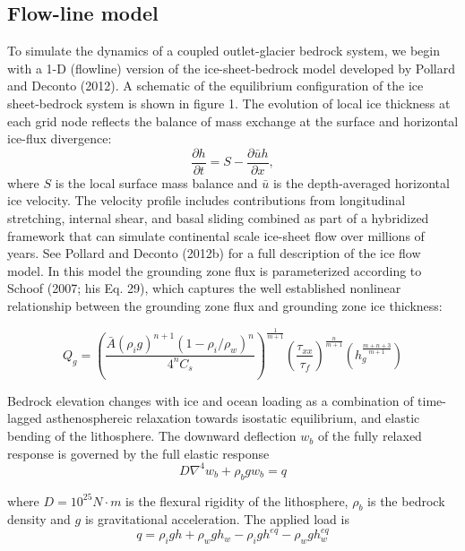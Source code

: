 \documentclass[tc, manuscript]{copernicus}
\begin{document}
\subsection{Flow-line model}
To simulate the dynamics of a coupled outlet-glacier bedrock system, we begin with a 1-D (flowline) version of the ice-sheet-bedrock model developed by Pollard and Deconto (2012). A schematic of the equilibrium configuration of the  ice sheet-bedrock system is shown in figure 1. The evolution of local ice thickness at each grid node reflects the balance of mass exchange at the surface and horizontal ice-flux divergence: 
\begin{equation}
\frac{\partial h}{\partial t} = S - \frac{\partial \bar{u}h}{\partial x},
\end{equation}
where $S$ is the local surface mass balance and $\bar{u}$ is the depth-averaged horizontal ice velocity. The velocity profile includes contributions from longitudinal stretching, internal shear, and basal sliding combined as part of a hybridized framework that can simulate continental scale ice-sheet flow over millions of years.
See Pollard and Deconto (2012b) for a full description of the ice flow model. In this model the grounding zone flux is parameterized according to Schoof (2007; his Eq. 29), which captures the well established nonlinear relationship between the grounding zone flux and grounding zone ice thickness:

\begin{equation}
Q_g = \left(\frac{\bar{A}(\rho_i g)^{n+1}(1-\rho_i/\rho_w)^n}{4^nC_s}\right)^{\frac{1}{m+1}} \left(\frac{\tau_{xx}}{\tau_f}\right)^{\frac{n}{m+1}}\left(h_g^{\frac{m+n+3}{m+1}}\right)
\end{equation}



Bedrock elevation changes with ice and ocean loading as a combination of time-lagged asthenosphereic relaxation towards isostatic equilibrium, and elastic bending of the lithosphere. The downward deflection $w_b$ of the fully relaxed response is governed by the full elastic response 
\begin{equation}
D\nabla^4 w_b + \rho_b g w_b = q
\end{equation}

where $D = 10^{25} N\cdot m$ is the flexural rigidity of the lithosphere, $\rho_b$ is the bedrock density and $g$ is gravitational acceleration. The applied load is 
\begin{equation}
q = \rho_i g h + \rho_w g h_w - \rho_i g h^{eq} - \rho_w g h_w^{eq} 
\end{equation}
\end{document}
